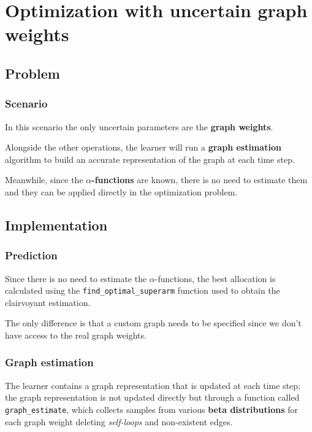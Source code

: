 \chapter{Optimization with uncertain graph weights}
\label{chap:unc_weights}

\section{Problem}

\subsection{Scenario}

In this scenario the only uncertain parameters are the \textbf{graph weights}.

Alongside the other operations, the learner will run a \textbf{graph estimation} algorithm to build an accurate representation of the graph at each time step.

Meanwhile, since the \textbf{$\alpha$-functions} are known, there is no need to estimate them and they can be applied directly in the optimization problem.

\section{Implementation}

\subsection{Prediction}

Since there is no need to estimate the $\alpha$-functions, the best allocation is calculated using the \texttt{find\_optimal\_superarm} function used to obtain the clairvoyant estimation.

The only difference is that a custom graph needs to be specified since we don't have access to the real graph weights.

\subsection{Graph estimation}

The learner contains a graph representation that is updated at each time step; the graph representation is not updated directly but through a function called \texttt{graph\_estimate}, which collects samples from various \textbf{beta distributions} for each graph weight deleting \textit{self-loops} and non-existent edges.

